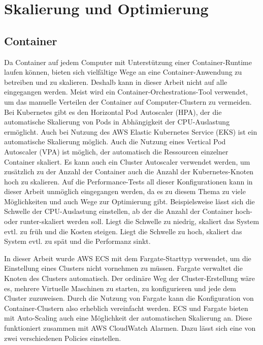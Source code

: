 \section{Skalierung und Optimierung}
\subsection{Container}
Da Container auf jedem Computer mit Unterstützung einer Container-Runtime laufen können, bieten sich vielfältige Wege an eine Container-Anwendung zu betreiben und zu skalieren. Deshalb kann in dieser Arbeit nicht auf alle eingegangen werden. Meist wird ein Container-Orchestrations-Tool verwendet, um das manuelle Verteilen der Container auf Computer-Clustern zu vermeiden. Bei Kubernetes gibt es den Horizontal Pod Autoscaler (HPA), der die automatische Skalierung von Pods in Abhängigkeit der CPU-Auslastung ermöglicht\cite{noauthor_horizontal_nodate-1}. Auch bei Nutzung des AWS Elastic Kubernetes Service (EKS) ist ein automatische Skalierung möglich\cite{noauthor_horizontal_nodate}. Auch die Nutzung eines Vertical Pod Autoscaler (VPA) ist möglich, der automatisch die Ressourcen einzelner Container skaliert\cite{noauthor_vertical_nodate}. Es kann auch ein Cluster Autoscaler verwendet werden, um zusätzlich zu der Anzahl der Container auch die Anzahl der Kubernetes-Knoten hoch zu skalieren\cite{noauthor_cluster_nodate}.
Auf die Performance-Tests all dieser Konfigurationen kann in dieser Arbeit unmöglich eingegangen werden, da es zu diesem Thema zu viele Möglichkeiten und auch Wege zur Optimierung gibt. Beispielsweise lässt sich die Schwelle der CPU-Auslastung einstellen, ab der die Anzahl der Container hoch- oder runter-skaliert werden soll. Liegt die Schwelle zu niedrig, skaliert das System evtl. zu früh und die Kosten steigen. Liegt die Schwelle zu hoch, skaliert das System evtl. zu spät und die Performanz sinkt.

In dieser Arbeit wurde AWS ECS mit dem Fargate-Starttyp verwendet, um die Einstellung eines Clusters nicht vornehmen zu müssen. Fargate verwaltet die Knoten des Clusters automatisch. Der ordinäre Weg der Cluster-Erstellung wäre es, mehrere Virtuelle Maschinen zu starten, zu konfigurieren und jede dem Cluster zuzuweisen. Durch die Nutzung von Fargate kann die Konfiguration von Container-Clustern also erheblich vereinfacht werden. ECS und Fargate bieten mit Auto-Scaling auch eine Möglichkeit der automatischen Skalierung an. Diese funktioniert zusammen mit AWS CloudWatch Alarmen. Dazu lässt sich eine von zwei verschiedenen Policies einstellen.

